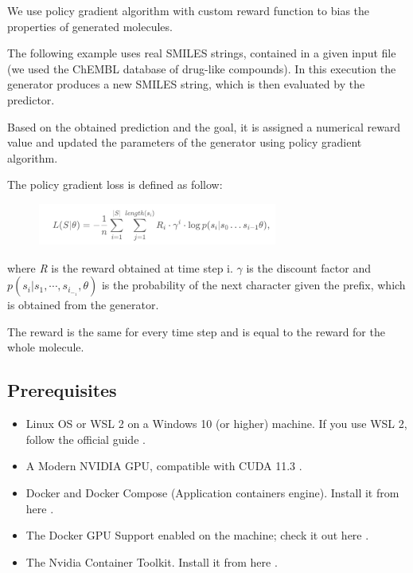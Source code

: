 \documentclass[a4paper]{article}
\begin{document}
We use policy gradient algorithm with custom reward function to bias the properties of generated molecules.


The following example uses real SMILES strings, contained in a given input file (we used the ChEMBL database of drug-like compounds).
In this execution the generator produces a new SMILES string, which is then evaluated by the predictor. 


Based on the obtained prediction and the goal, it is assigned a numerical reward value and updated the parameters of the generator using policy gradient algorithm.
 
The policy gradient loss is defined as follow:

\begin{figure}[htbp]
    \centering
        \includegraphics[width=0.70\textwidth]{formula.png}
    \label{fig:formula}
\end{figure}

where \textit{R} is the reward obtained at time step i. \begin{math}\gamma\end{math} is the discount factor and \begin{math} p(s_i | s_1,\cdots ,s_i_-_1,\theta) \end{math} is the probability of the next character given the prefix, which is obtained from the generator. 


The reward is the same for every time step and is equal to the reward for the whole molecule. 

\subsection{Prerequisites}\label{sec:Prerequisites}

\begin{itemize}
	\item Linux OS or WSL 2 on a Windows 10 (or higher) machine. If you use WSL 2, follow the official guide \cite{wsl-user-guide}.
	\item A Modern NVIDIA GPU, compatible with CUDA 11.3 \cite{cuda-download}.
	\item Docker and Docker Compose (Application containers engine). Install it from here \cite{docker-guide}.
	\item The Docker GPU Support enabled on the machine; check it out here \cite{gpu-support}.
	\item The Nvidia Container Toolkit. Install it from here \cite{nvidia-toolkit}.
\end{itemize}
\end{document}
